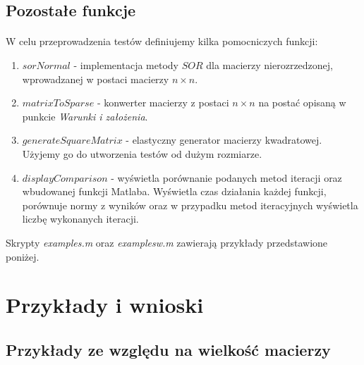 \documentclass{article}
\begin{document}
\subsection{Pozostałe funkcje}
\paragraph{}
W celu przeprowadzenia testów definiujemy kilka pomocniczych funkcji:
\begin{enumerate}
\item $sorNormal$ - implementacja metody $SOR$ dla macierzy nierozrzedzonej, wprowadzanej w postaci macierzy $n\times n$.
\item $matrixToSparse$ - konwerter macierzy z postaci $n\times n$ na postać opisaną w punkcie \textit{Warunki i założenia}.
\item $generateSquareMatrix$ - elastyczny generator macierzy kwadratowej. Użyjemy go do utworzenia testów od dużym rozmiarze.
\item $displayComparison$ - wyświetla porównanie podanych metod iteracji oraz wbudowanej funkcji Matlaba. Wyświetla czas działania każdej funkcji, porównuje normy z wyników oraz w przypadku metod iteracyjnych wyświetla liczbę wykonanych iteracji.
\end{enumerate}
Skrypty \textit{examples.m} oraz \textit{examplesw.m} zawierają przykłady przedstawione poniżej.
\section{Przykłady i wnioski}
\subsection{Przykłady ze względu na wielkość macierzy}
\end{document}
